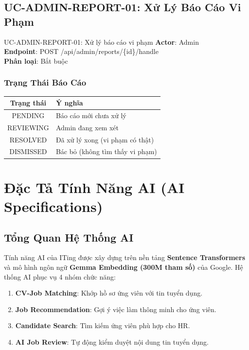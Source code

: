 \documentclass[12pt, a4paper]{report}
\begin{document}
\section{UC-ADMIN-REPORT-01: Xử Lý Báo Cáo Vi Phạm}

\begin{requirementbox}{UC-ADMIN-REPORT-01: Xử lý báo cáo vi phạm}
\textbf{Actor}: Admin \\
\textbf{Endpoint}: POST /api/admin/reports/\{id\}/handle \\
\textbf{Phân loại}: Bắt buộc
\end{requirementbox}

\subsection{Trạng Thái Báo Cáo}

\begin{center}
\begin{tabular}{|c|p{10cm}|}
\hline
\textbf{Trạng thái} & \textbf{Ý nghĩa} \\
\hline
PENDING & Báo cáo mới chưa xử lý \\
\hline
REVIEWING & Admin đang xem xét \\
\hline
RESOLVED & Đã xử lý xong (vi phạm có thật) \\
\hline
DISMISSED & Bác bỏ (không tìm thấy vi phạm) \\
\hline
\end{tabular}
\end{center}

\chapter{Đặc Tả Tính Năng AI (AI Specifications)}

\section{Tổng Quan Hệ Thống AI}

Tính năng AI của ITing được xây dựng trên nền tảng \textbf{Sentence Transformers} và mô hình ngôn ngữ \textbf{Gemma Embedding (300M tham số)} của Google. Hệ thống AI phục vụ 4 nhóm chức năng:

\begin{enumerate}
    \item \textbf{CV-Job Matching}: Khớp hồ sơ ứng viên với tin tuyển dụng.
    \item \textbf{Job Recommendation}: Gợi ý việc làm thông minh cho ứng viên.
    \item \textbf{Candidate Search}: Tìm kiếm ứng viên phù hợp cho HR.
    \item \textbf{AI Job Review}: Tự động kiểm duyệt nội dung tin tuyển dụng.
\end{enumerate}
\end{document}
